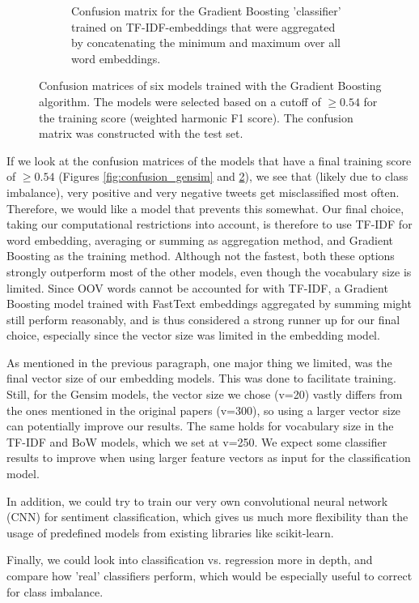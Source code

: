 \begin{figure}
\begin{subfigure}[b]{0.475\textwidth}
        \caption{Confusion matrix for the Gradient Boosting 'classifier' trained on TF-IDF-embeddings that were aggregated by concatenating the minimum and maximum over all word embeddings.}
        \label{fig:grad_boost_mm_tfidf}
    \end{subfigure}
    \caption{Confusion matrices of six models trained with the Gradient Boosting algorithm. The models were selected based on a cutoff of $\ge 0.54$ for the training score (weighted harmonic F1 score). The confusion matrix was constructed with the test set.} 
    \label{fig:confusion_sklearn}
\end{figure}

If we look at the confusion matrices of the models that have a final training score of $\ge 0.54$ (Figures \ref{fig:confusion_gensim} and \ref{fig:confusion_sklearn}), we see that (likely due to class imbalance), very positive and very negative tweets get misclassified most often. Therefore, we would like a model that prevents this somewhat.
Our final choice, taking our computational restrictions into account, is therefore to use TF-IDF for word embedding, averaging or summing as aggregation method, and Gradient Boosting as the training method. Although not the fastest, both these options strongly outperform most of the other models, even though the vocabulary size is limited.
Since OOV words cannot be accounted for with TF-IDF, a Gradient Boosting model trained with FastText embeddings aggregated by summing might still perform reasonably, and is thus considered a strong runner up for our final choice, especially since the vector size was limited in the embedding model.

As mentioned in the previous paragraph, one major thing we limited, was the final vector size of our embedding models. This was done to facilitate training. Still, for the Gensim models, the vector size we chose (v=20) vastly differs from the ones mentioned in the original papers (v=300), so using a larger vector size can potentially improve our results. The same holds for vocabulary size in the TF-IDF and BoW models, which we set at v=250. We expect some classifier results to improve when using larger feature vectors as input for the classification model.

In addition, we could try to train our very own convolutional neural network (CNN) for sentiment classification, which gives us much more flexibility than the usage of predefined models from existing libraries like scikit-learn.

Finally, we could look into classification vs. regression more in depth, and compare how 'real' classifiers perform, which would be especially useful to correct for class imbalance.
